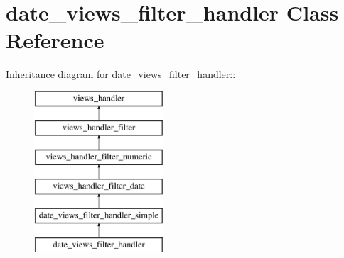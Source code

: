 \hypertarget{classdate__views__filter__handler}{
\section{date\_\-views\_\-filter\_\-handler Class Reference}
\label{classdate__views__filter__handler}
}
Inheritance diagram for date\_\-views\_\-filter\_\-handler::\begin{figure}[H]
\begin{center}
\leavevmode
\includegraphics[height=6cm]{classdate__views__filter__handler}
\end{center}
\end{figure}

